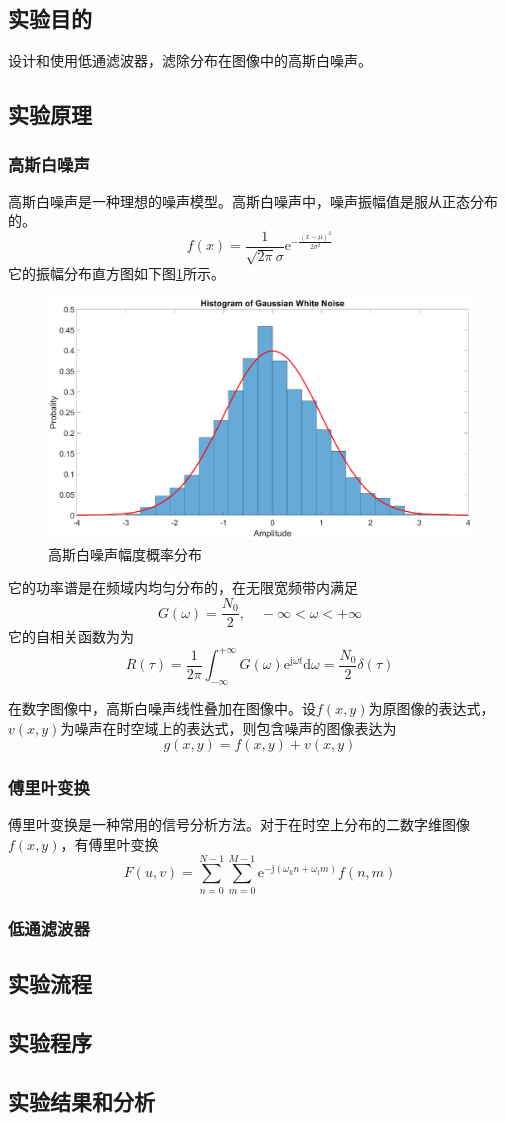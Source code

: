 \subsection{实验目的}
设计和使用低通滤波器，滤除分布在图像中的高斯白噪声。
\subsection{实验原理}
\subsubsection{高斯白噪声}
高斯白噪声是一种理想的噪声模型。高斯白噪声中，噪声振幅值是服从正态分布的。
\[ f(x)=\frac{1}{\sqrt{2\pi}\sigma}\mathrm{e}^{-\frac{(x-\mu)^2}{2\sigma^2}} \]
它的振幅分布直方图如下图\ref{fig:gwnhistogram}所示。
\begin{figure}[H]
	\centering
	\includegraphics[width=0.7\linewidth]{figure/gwn_histogram}
	\caption{高斯白噪声幅度概率分布}
	\label{fig:gwnhistogram}
\end{figure}
它的功率谱是在频域内均匀分布的，在无限宽频带内满足
\[ G(\omega) = \frac{N_0}{2},\quad -\infty<\omega<+\infty \]
它的自相关函数为为
\[ R(\tau) = \frac{1}{2\pi}\int_{-\infty}^{+\infty}G(\omega)\mathrm{e}^{\mathrm{j}\omega t}\mathrm{d}\omega=\frac{N_0}{2}\delta(\tau) \]

在数字图像中，高斯白噪声线性叠加在图像中。设$f(x, y)$为原图像的表达式，$v(x, y)$为噪声在时空域上的表达式，则包含噪声的图像表达为
\[ g(x, y) = f(x, y) + v(x, y)\]
\subsubsection{傅里叶变换}
傅里叶变换是一种常用的信号分析方法。对于在时空上分布的二数字维图像$f(x, y)$，有傅里叶变换
\[ F(u, v) = \sum_{n = 0}^{N - 1}\sum_{m = 0}^{M - 1}\mathrm{e}^{-\mathrm{j}(\omega_kn+\omega_lm)}f(n, m) \]
\subsubsection{低通滤波器}
\subsection{实验流程}
\subsection{实验程序}
\subsection{实验结果和分析}